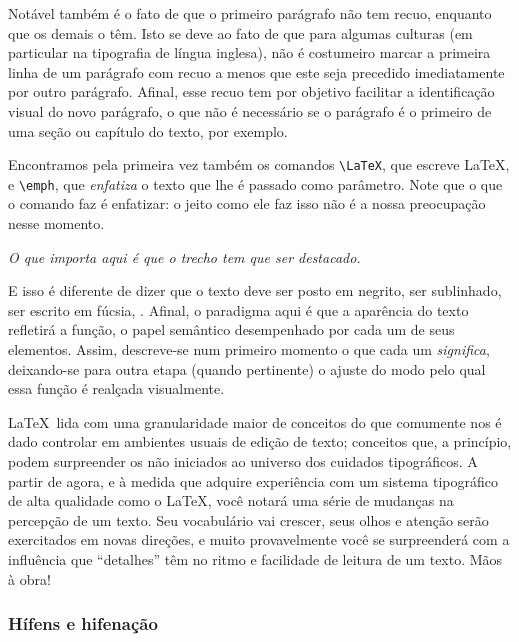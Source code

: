 Notável também é o fato de que o primeiro
parágrafo não tem recuo, enquanto que os
demais o têm. Isto se deve ao fato de que para algumas culturas (em
particular na tipografia de língua inglesa), não é costumeiro marcar a
primeira linha de um parágrafo com recuo a menos que este seja
precedido imediatamente por outro parágrafo. Afinal, esse recuo tem
por objetivo facilitar a identificação visual do novo parágrafo, o que
não é necessário se o parágrafo é o primeiro de uma seção ou capítulo
do texto, por exemplo.

Encontramos pela primeira vez também os comandos \verb'\LaTeX', que
escreve \LaTeX, e \verb'\emph', que \emph{enfatiza} o texto que lhe é
passado como parâmetro. Note que o que o comando faz é enfatizar: o
jeito como ele faz isso não é a nossa preocupação nesse momento.

\begin{center}
\it O que importa aqui é que o trecho tem que ser destacado.  
\end{center}

E isso é diferente de dizer que o texto deve ser posto em negrito, ser
sublinhado, ser escrito em fúcsia,  
  . Afinal, o
paradigma aqui é que a aparência do texto refletirá a função, o papel
semântico desempenhado por cada um de seus elementos. Assim,
descreve-se num primeiro momento o que cada um
\emph{significa},
deixando-se para outra etapa (quando pertinente) o ajuste do modo pelo
qual essa função é realçada visualmente.

\LaTeX\ lida com uma granularidade maior de conceitos do que comumente
nos é dado controlar em ambientes usuais de edição de texto; conceitos
que, a princípio, podem surpreender os não iniciados ao universo dos
cuidados tipográficos. A partir de agora, e à medida que adquire
experiência com um sistema tipográfico de alta qualidade como o
\LaTeX, você notará uma série de mudanças na percepção de um texto. Seu
vocabulário vai crescer, seus olhos e atenção serão exercitados em
novas direções, e muito provavelmente você se surpreenderá com a
influência que ``detalhes'' têm no ritmo e facilidade de leitura de um
texto. Mãos à obra!

\subsubsection{Hífens e hifenação}\label{subsec:hifenacao}

